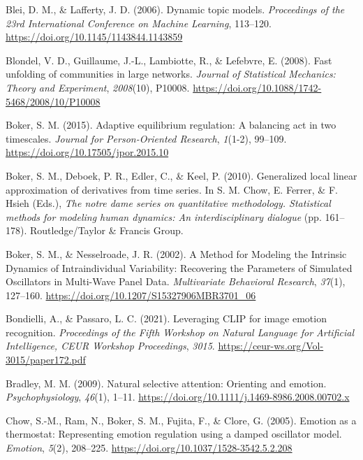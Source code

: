 \documentclass[
]{article}
\newlength{\cslhangindent}
\newenvironment{CSLReferences}[2] %
 {\begin{list}{}{%
  \setlength{\itemindent}{0pt}
  \setlength{\leftmargin}{0pt}
  \setlength{\parsep}{0pt}
  \ifodd #1
   \setlength{\leftmargin}{\cslhangindent}
   \setlength{\itemindent}{-1\cslhangindent}
  \fi
  \setlength{\itemsep}{#2\baselineskip}}}
 {\end{list}}
\begin{document}
\label{refs}
\begin{CSLReferences}{1}{0}
Blei, D. M., \& Lafferty, J. D. (2006). Dynamic topic models.
\emph{Proceedings of the 23rd International Conference on Machine
Learning}, 113--120. \url{https://doi.org/10.1145/1143844.1143859}

Blondel, V. D., Guillaume, J.-L., Lambiotte, R., \& Lefebvre, E. (2008).
Fast unfolding of communities in large networks. \emph{Journal of
Statistical Mechanics: Theory and Experiment}, \emph{2008}(10), P10008.
\url{https://doi.org/10.1088/1742-5468/2008/10/P10008}

Boker, S. M. (2015). Adaptive equilibrium regulation: {A} balancing act
in two timescales. \emph{Journal for Person-Oriented Research},
\emph{1}(1-2), 99--109. \url{https://doi.org/10.17505/jpor.2015.10}

Boker, S. M., Deboek, P. R., Edler, C., \& Keel, P. (2010). Generalized
local linear approximation of derivatives from time series. In S. M.
Chow, E. Ferrer, \& F. Hsieh (Eds.), \emph{The notre dame series on
quantitative methodology. Statistical methods for modeling human
dynamics: An interdisciplinary dialogue} (pp. 161--178).
Routledge/Taylor \& Francis Group.

Boker, S. M., \& Nesselroade, J. R. (2002). A {Method} for {Modeling}
the {Intrinsic Dynamics} of {Intraindividual Variability}: {Recovering}
the {Parameters} of {Simulated Oscillators} in {Multi-Wave Panel Data}.
\emph{Multivariate Behavioral Research}, \emph{37}(1), 127--160.
\url{https://doi.org/10.1207/S15327906MBR3701_06}

Bondielli, A., \& Passaro, L. C. (2021). Leveraging {CLIP} for image
emotion recognition. \emph{Proceedings of the Fifth Workshop on Natural
Language for Artificial Intelligence, CEUR Workshop Proceedings},
\emph{3015}. \url{https://ceur-ws.org/Vol-3015/paper172.pdf}

Bradley, M. M. (2009). Natural selective attention: Orienting and
emotion. \emph{Psychophysiology}, \emph{46}(1), 1--11.
\url{https://doi.org/10.1111/j.1469-8986.2008.00702.x}

Chow, S.-M., Ram, N., Boker, S. M., Fujita, F., \& Clore, G. (2005).
Emotion as a thermostat: Representing emotion regulation using a damped
oscillator model. \emph{Emotion}, \emph{5}(2), 208--225.
\url{https://doi.org/10.1037/1528-3542.5.2.208}


\end{CSLReferences}
\end{document}

